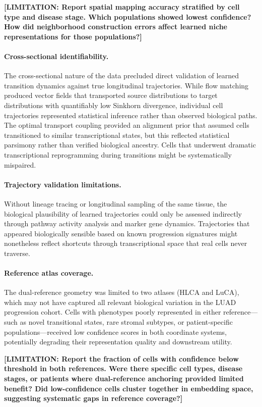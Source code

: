 \textbf{[LIMITATION: Report spatial mapping accuracy stratified by cell type and disease stage. Which populations showed lowest confidence? How did neighborhood construction errors affect learned niche representations for those populations?]}

\paragraph{Cross-sectional identifiability.} The cross-sectional nature of the data precluded direct validation of learned transition dynamics against true longitudinal trajectories. While flow matching produced vector fields that transported source distributions to target distributions with quantifiably low Sinkhorn divergence, individual cell trajectories represented statistical inference rather than observed biological paths. The optimal transport coupling provided an alignment prior that assumed cells transitioned to similar transcriptional states, but this reflected statistical parsimony rather than verified biological ancestry. Cells that underwent dramatic transcriptional reprogramming during transitions might be systematically mispaired.

\paragraph{Trajectory validation limitations.} Without lineage tracing or longitudinal sampling of the same tissue, the biological plausibility of learned trajectories could only be assessed indirectly through pathway activity analysis and marker gene dynamics. Trajectories that appeared biologically sensible based on known progression signatures might nonetheless reflect shortcuts through transcriptional space that real cells never traverse.

\paragraph{Reference atlas coverage.} The dual-reference geometry was limited to two atlases (HLCA and LuCA), which may not have captured all relevant biological variation in the LUAD progression cohort. Cells with phenotypes poorly represented in either reference---such as novel transitional states, rare stromal subtypes, or patient-specific populations---received low confidence scores in both coordinate systems, potentially degrading their representation quality and downstream utility.

\textbf{[LIMITATION: Report the fraction of cells with confidence below threshold in both references. Were there specific cell types, disease stages, or patients where dual-reference anchoring provided limited benefit? Did low-confidence cells cluster together in embedding space, suggesting systematic gaps in reference coverage?]}

